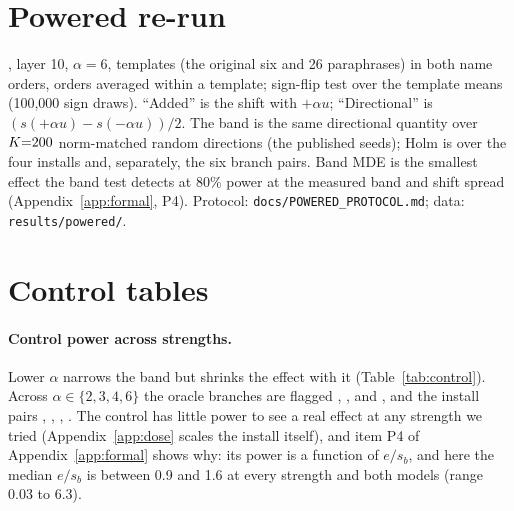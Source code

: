 \documentclass{article}
\begin{document}
\section{Powered re-run}
\label{app:powered}
\ModelA{}, layer 10, $\alpha{=}6$, \pwNTemplates{} templates (the original six and 26 paraphrases) in both name orders, orders averaged within a template; sign-flip test over the template means (100{,}000 sign draws). ``Added'' is the shift with $+\alpha u$; ``Directional'' is $(s(+\alpha u)-s(-\alpha u))/2$. The band is the same directional quantity over $K{=}200$ norm-matched random directions (the published seeds); Holm is over the four installs and, separately, the six branch pairs. Band MDE is the smallest effect the band test detects at 80\% power at the measured band and shift spread (Appendix~\ref{app:formal}, P4). Protocol: \texttt{docs/POWERED\_PROTOCOL.md}; data: \texttt{results/powered/}.
\begin{table}[h]
\centering
\scriptsize
\caption{Powered re-run of the steering audit.}
\label{tab:powered}

\end{table}

\section{Control tables}
\label{app:control}
\paragraph{Control power across strengths.}
Lower $\alpha$ narrows the band but shrinks the effect with it (Table~\ref{tab:control}). Across
$\alpha\in\{2,3,4,6\}$ the oracle branches are flagged \oracleRateTwoA{}, \oracleRateThreeA{},
\oracleRateFourA{} and \oracleRateSixA{}, and the install pairs \installRateTwoA{}, \installRateThreeA{},
\installRateFourA{}, \installRateSixA{}. The control has little power to see a real effect at any strength we
tried (Appendix~\ref{app:dose} scales the install itself), and item P4 of Appendix~\ref{app:formal} shows why: its power is a function of $e/s_b$, and here the median $e/s_b$ is
between 0.9 and 1.6 at every strength and both models (range 0.03 to 6.3).
\end{document}
